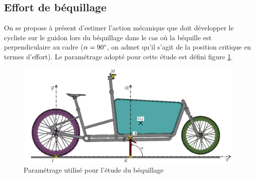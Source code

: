 

\subsection{Effort de béquillage}

On se propose à présent d'estimer l'action mécanique que doit développer le cycliste sur le guidon lors du
béquillage dans le cas où la béquille est perpendiculaire au cadre ($\alpha = 90\degree$, on admet qu'il s'agit de la position critique en termes d'effort). Le paramétrage adopté pour cette étude est défini figure \ref{fig05}.

\begin{figure}[!ht]
\begin{center}
\includegraphics[width=0.8\linewidth]{img/fig05}
\caption{\label{fig05}Paramétrage utilisé pour l'étude du béquillage}
\end{center}
\end{figure}

